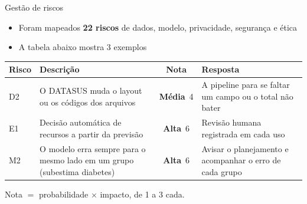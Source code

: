 \documentclass[aspectratio=169,10pt]{beamer}
\newcommand{\chave}[1]{\textcolor{dcblue}{\textbf{#1}}}
\newcommand{\nota}[1]{{\color{dcgreydark}\scriptsize #1\par}}
\newcommand{\alta}{\textcolor{nivelalerta}{\textbf{Alta}}}
\begin{document}
\begin{frame}{Gestão de riscos}
  \vfill
  \setlength{\leftmargini}{0.9em}
  \begin{itemize}
    \setlength{\itemsep}{4pt}
    \item Foram mapeados \chave{22 riscos} de dados, modelo, privacidade, segurança e ética
    \item A tabela abaixo mostra 3 exemplos
  \end{itemize}
  \vfill
  \small
  \renewcommand{\arraystretch}{1.4}
  \begin{tabular}{@{}l>{\raggedright\arraybackslash}p{}c>{\raggedright\arraybackslash}p{}@{}}
    \toprule
    \textbf{Risco} & \textbf{Descrição} & \textbf{Nota} & \textbf{Resposta} \\
    \midrule
    D2 & O DATASUS muda o layout ou os códigos dos arquivos & \textcolor{nivelatencao}{\textbf{Média}}~4 & A pipeline para se faltar um campo ou o total não bater \\
    E1 & Decisão automática de recursos a partir da previsão & \alta~6 & Revisão humana registrada em cada uso \\
    M2 & O modelo erra sempre para o mesmo lado em um grupo (subestima diabetes) & \alta~6 & Avisar o planejamento e acompanhar o erro de cada grupo \\
    \bottomrule
  \end{tabular}\par
  \vspace{0.25cm}
  \nota{Nota $=$ probabilidade $\times$ impacto, de 1 a 3 cada.}
  \vfill
\end{frame}
\end{document}
